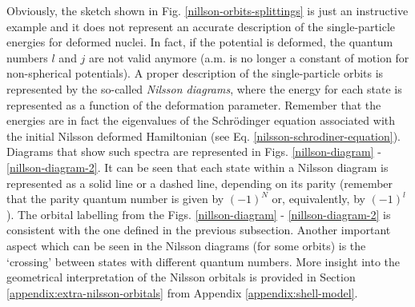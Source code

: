Obviously, the sketch shown in Fig. \ref{nillson-orbits-splittings} is just an instructive example and it does not represent an accurate description of the single-particle energies for deformed nuclei. In fact, if the potential is deformed, the quantum numbers $l$ and $j$ are not valid anymore (a.m. is no longer a constant of motion for non-spherical potentials). A proper description of the single-particle orbits is represented by the so-called \emph{Nilsson diagrams}, where the energy for each state is represented as a function of the deformation parameter. Remember that the energies are in fact the eigenvalues of the Schrödinger equation associated with the initial Nilsson deformed Hamiltonian (see Eq. \eqref{nilsson-schrodiner-equation}). Diagrams that show such spectra are represented in Figs. \ref{nillson-diagram} - \ref{nillson-diagram-2}. It can be seen that each state within a Nilsson diagram is represented as a solid line or a dashed line, depending on its parity (remember that the parity quantum number is given by $(-1)^N$ or, equivalently, by $(-1)^l$). The orbital labelling from the Figs. \ref{nillson-diagram} - \ref{nillson-diagram-2} is consistent with the one defined in the previous subsection. Another important aspect which can be seen in the Nilsson diagrams (for some orbits) is the `crossing' between states with different quantum numbers. More insight into the geometrical interpretation of the Nilsson orbitals is provided in Section \ref{appendix:extra-nilsson-orbitals} from Appendix \ref{appendix:shell-model}.

